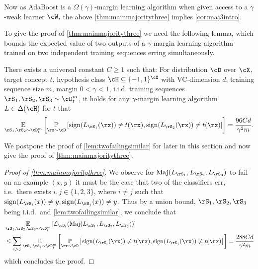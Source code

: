 Now as AdaBoost is a $ \Omega(\gamma)$-margin learning algorithm when given access to a $ \gamma $-weak learner $ \cW,$ the above \cref{thm:mainmajoritythree} implies \cref{cor:maj3intro}.

To give the proof of \cref{thm:mainmajoritythree} we need the following lemma, which bounds the expected value of two outputs of a $ \gamma $-margin learning algorithm trained on two independent training sequences erring simultaneously. 

\begin{lemma}\label{lem:twofailingsimilar}
    There exists a universal constant $ C\geq1 $ such that: For distribution $ \cD $ over $ \cX $, target concept $ t $,  hypothesis class $ \cH \subseteq \{-1,1  \}^{\cX} $ with VC-dimension $ d $,  training sequence size $ m $, margin $ 0<\gamma<1 $, i.i.d. training sequences $ \rS_{1},\rS_{2},\rS_{3}\sim \cD_{t}^{m} $, it holds for any $ \gamma $-margin learning algorithm $ L\in \dlh $ for $ t $  that  
    \begin{align*}
    \e_{\rS_{1},\rS_{2}\sim \cD^{m}_{t}}\left[\p_{\rx\sim\cD}\left[   \sign(L_{\rS_{1}}(\rx))\not=t(\rx),\sign(L_{\rS_{2}}(\rx))\not=t(\rx)\right]\right] =\frac{96Cd}{\gamma^{2}m}.
    \end{align*}
\end{lemma}

We postpone the proof of \cref{lem:twofailingsimilar} for later in this section and now give the proof of \cref{thm:mainmajoritythree}.

\begin{proof}[Proof of \cref{thm:mainmajoritythree}]
We observe for $ \maj(L_{\rS_{1}},L_{\rS_{2}},L_{\rS_{3}}) $ to fail on an example $ (x,y) $ it must be the case that two of the classifiers err, i.e.\ there exists $ i,j\in\{1,2,3  \}  $, where $ i\not=j $   such that $ \sign(L_{\rS_{i}}(x))\not=y,\sign(L_{\rS_{j}}(x))\not=y $. Thus by a union bound, $ \rS_{1},\rS_{2},\rS_{3} $ being i.i.d.\ and \cref{lem:twofailingsimilar}, we conclude that
\begin{align*}
    &\e_{\rS_{1},\rS_{2},\rS_{3}\sim \cD^{m}_{t}}\left[\ls_{\cD_{t}}(\maj(L_{\rS_{1}},L_{\rS_{2}},L_{\rS_{3}}))\right]
    \\
    &\leq \sum_{i>j}\e_{\rS_{i},\rS_{j}\sim \cD^{m}_{t}}\left[\p_{\rx\sim\cD}\left[   \sign(L_{\rS_{i}}(\rx))\not=t(\rx),\sign(L_{\rS_{j}}(\rx))\not=t(\rx)\right]\right]
    =\frac{288Cd}{\gamma^{2}m}
\end{align*} 
which concludes the proof. 
\end{proof}

